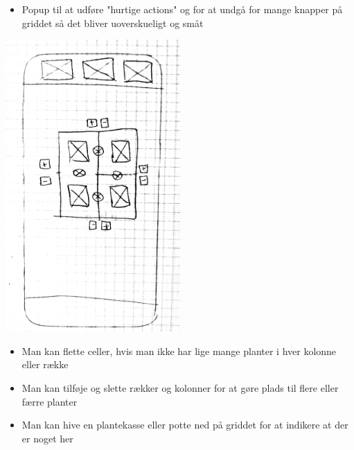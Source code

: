 \begin{itemize}
    \item Popup til at udføre "hurtige actions" og for at undgå for mange knapper på griddet så det bliver uoverskueligt og småt
\end{itemize}

\includegraphics[width=0.5\textwidth]{img/s1-8.jpg}\\

\begin{itemize}
    \item Man kan flette celler, hvis man ikke har lige mange planter i hver kolonne eller række
    \item Man kan tilføje og slette rækker og kolonner for at gøre plads til flere eller færre planter
    \item Man kan hive en plantekasse eller potte ned på griddet for at indikere at der er noget her
\end{itemize}
